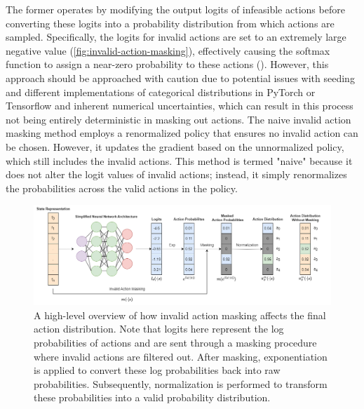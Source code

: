 \noindent The former operates by modifying the output logits of infeasible actions before converting these logits into a probability distribution from which actions are sampled. Specifically, the logits for invalid actions are set to an extremely large negative value (\textcolor{deepblue}{\autoref{fig:invalid-action-masking}}), effectively causing the softmax function to assign a near-zero probability to these actions (\textcolor{deepblue}{\cite{Huang_2022}}). However, this approach should be approached with caution due to potential issues with seeding and different implementations of categorical distributions in PyTorch or Tensorflow and inherent numerical uncertainties, which can result in this process not being entirely deterministic in masking out actions. The naive invalid action masking method employs a renormalized policy that ensures no invalid action can be chosen. However, it updates the gradient based on the unnormalized policy, which still includes the invalid actions. This method is termed "naive" because it does not alter the logit values of invalid actions; instead, it simply renormalizes the probabilities across the valid actions in the policy.

\bigskip

\begin{figure}[htbp]
    \centering
    \includegraphics[width=1\linewidth]{images/methods_algos/m_ppo/invalidactionmasking.png}
    \captionsetup{justification=justified, singlelinecheck=false, width=1\linewidth, labelfont=bf} 
    \caption[]{A high-level overview of how invalid action masking affects the final action distribution. Note that logits here represent the log probabilities of actions and are sent through a masking procedure where invalid actions are filtered out. After masking, exponentiation is applied to convert these log probabilities back into raw probabilities. Subsequently, normalization is performed to transform these probabilities into a valid probability distribution.}
    \label{fig:invalid-action-masking}
\end{figure}

